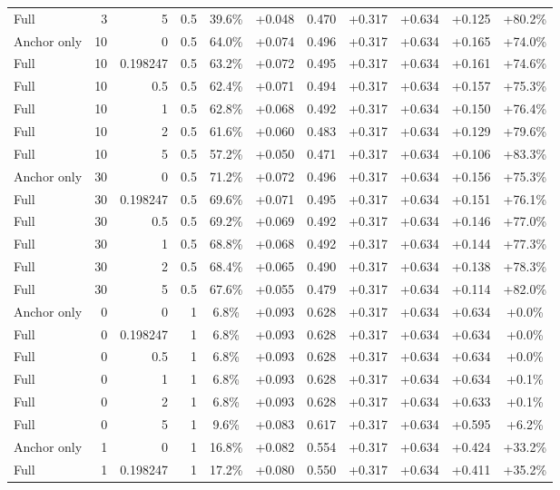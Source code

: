 \begin{table}[htbp]
\begin{tabular}{lrrrccccccc}
Full & 3 & 5 & 0.5 & 39.6\% & +0.048 & 0.470 & +0.317 & +0.634 & +0.125 & +80.2\% \\
Anchor only & 10 & 0 & 0.5 & 64.0\% & +0.074 & 0.496 & +0.317 & +0.634 & +0.165 & +74.0\% \\
Full & 10 & 0.198247 & 0.5 & 63.2\% & +0.072 & 0.495 & +0.317 & +0.634 & +0.161 & +74.6\% \\
Full & 10 & 0.5 & 0.5 & 62.4\% & +0.071 & 0.494 & +0.317 & +0.634 & +0.157 & +75.3\% \\
Full & 10 & 1 & 0.5 & 62.8\% & +0.068 & 0.492 & +0.317 & +0.634 & +0.150 & +76.4\% \\
Full & 10 & 2 & 0.5 & 61.6\% & +0.060 & 0.483 & +0.317 & +0.634 & +0.129 & +79.6\% \\
Full & 10 & 5 & 0.5 & 57.2\% & +0.050 & 0.471 & +0.317 & +0.634 & +0.106 & +83.3\% \\
Anchor only & 30 & 0 & 0.5 & 71.2\% & +0.072 & 0.496 & +0.317 & +0.634 & +0.156 & +75.3\% \\
Full & 30 & 0.198247 & 0.5 & 69.6\% & +0.071 & 0.495 & +0.317 & +0.634 & +0.151 & +76.1\% \\
Full & 30 & 0.5 & 0.5 & 69.2\% & +0.069 & 0.492 & +0.317 & +0.634 & +0.146 & +77.0\% \\
Full & 30 & 1 & 0.5 & 68.8\% & +0.068 & 0.492 & +0.317 & +0.634 & +0.144 & +77.3\% \\
Full & 30 & 2 & 0.5 & 68.4\% & +0.065 & 0.490 & +0.317 & +0.634 & +0.138 & +78.3\% \\
Full & 30 & 5 & 0.5 & 67.6\% & +0.055 & 0.479 & +0.317 & +0.634 & +0.114 & +82.0\% \\
Anchor only & 0 & 0 & 1 & 6.8\% & +0.093 & 0.628 & +0.317 & +0.634 & +0.634 & +0.0\% \\
Full & 0 & 0.198247 & 1 & 6.8\% & +0.093 & 0.628 & +0.317 & +0.634 & +0.634 & +0.0\% \\
Full & 0 & 0.5 & 1 & 6.8\% & +0.093 & 0.628 & +0.317 & +0.634 & +0.634 & +0.0\% \\
Full & 0 & 1 & 1 & 6.8\% & +0.093 & 0.628 & +0.317 & +0.634 & +0.634 & +0.1\% \\
Full & 0 & 2 & 1 & 6.8\% & +0.093 & 0.628 & +0.317 & +0.634 & +0.633 & +0.1\% \\
Full & 0 & 5 & 1 & 9.6\% & +0.083 & 0.617 & +0.317 & +0.634 & +0.595 & +6.2\% \\
Anchor only & 1 & 0 & 1 & 16.8\% & +0.082 & 0.554 & +0.317 & +0.634 & +0.424 & +33.2\% \\
Full & 1 & 0.198247 & 1 & 17.2\% & +0.080 & 0.550 & +0.317 & +0.634 & +0.411 & +35.2\% \\

\end{tabular}
\end{table}

